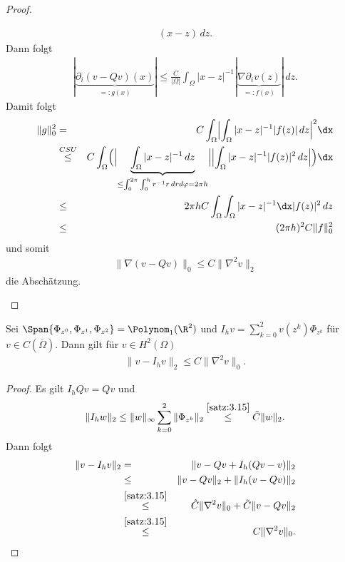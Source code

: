 \begin{proof}
\begin{enumerate}[a)]
\begin{eqnarray*}
                (x - z) \,dz.
        \end{eqnarray*}
        Dann folgt
        \begin{eqnarray*}
                |\underbrace{\partial_i (v - Qv)(x)}_{=: g(x)}|
            \le \frac{C}{|\Omega|} \int_\Omega |x - z|^{-1}
                |\underbrace{\nabla \partial_i v(z)}_{=: f(x)}| \,dz.
        \end{eqnarray*}
        Damit folgt
        \begin{eqnarray*}
                \|g\|_0^2
            &=& C \int_\Omega \Bigl|\int_\Omega |x - z|^{-1} |f(z)| \,dz
                \Bigr|^2 \dx \\
            &\stackrel{CSU}{\le}& C \int_\Omega \Bigl(\Bigl|\underbrace{\int
                _\Omega |x - z|^{-1} \,dz}_{\le \int_0^{2 \pi} \int_0^h r^{-1} r
                \,dr d\varphi = 2 \pi h} \Bigr| \Bigl|\int_\Omega |x - z|^{-1}
                |f(z)|^2 \,dz \Bigr| \Bigr) \dx \\
            &\le& 2 \pi h C \int_\Omega \int_\Omega |x - z|^{-1} \dx |f(z)|^2
                \,dz \\
            &\le& (2 \pi h)^2 C \|f\|_0^2
        \end{eqnarray*}
        und somit
        \begin{eqnarray*}
            \|\nabla (v - Qv)\|_0 \le C \|\nabla^2 v\|_2
        \end{eqnarray*}
        die Abschätzung.
    \end{enumerate}
\end{proof}


\begin{Folgerung}
    \label{fol:3.16}
    Sei $\Span\{\Phi_{z^0}, \Phi_{z^1}, \Phi_{z^2}\} = \Polynom_1(\R^2)$ und
    $I_h v = \sum_{k=0}^2 v\left(z^k\right) \Phi_{z^k}$ für
    $v\in C(\overline\Omega)$.
    Dann gilt für $v\in H^2(\Omega)$
    \begin{eqnarray*}
        \|v - I_h v\|_2 \le C \|\nabla^2 v\|_0.
    \end{eqnarray*}
\end{Folgerung}


\begin{proof}
    Es gilt $I_h Qv = Qv$ und
    \begin{eqnarray*}
            \|I_h w\|_2
        \le \|w\|_\infty \sum_{k=0}^2 \|\Phi_{z^k}\|_2
        \stackrel{\eqref{satz:3.15}}{\le}
            \tilde C \|w\|_2.
    \end{eqnarray*}
    Dann folgt
    \begin{eqnarray*}
            \|v - I_hv\|_2
        &=& \|v - Qv + I_h(Qv - v)\|_2 \\
        &\le& \|v - Qv\|_2 + \|I_h(v - Qv)\|_2 \\
        &\stackrel{\eqref{satz:3.15}}{\le}& \hat C \|\nabla^2 v\|_0
            + \tilde C \|v - Qv\|_2 \\
        &\stackrel{\eqref{satz:3.15}}{\le}& C \|\nabla^2 v\|_0.
    \end{eqnarray*}
\end{proof}


